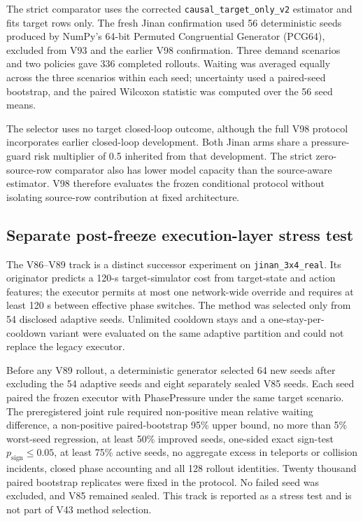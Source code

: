 The strict comparator uses the corrected
\texttt{causal\_target\_only\_v2} estimator and fits target rows only.  The fresh
Jinan confirmation used 56 deterministic seeds produced by NumPy's 64-bit
Permuted Congruential Generator (PCG64), excluded from V93 and the earlier V98
confirmation.  Three
demand scenarios and two policies gave 336
completed rollouts.  Waiting was averaged equally across the three scenarios
within each seed; uncertainty used a paired-seed bootstrap, and the paired
Wilcoxon statistic was computed over the 56 seed means.

The selector uses no target closed-loop outcome, although the full V98
protocol incorporates earlier closed-loop development.  Both Jinan arms share
a pressure-guard risk multiplier of 0.5 inherited from that development.
The strict zero-source-row comparator also has lower model capacity than the
source-aware estimator.  V98 therefore evaluates the frozen conditional
protocol without isolating source-row contribution at fixed architecture.

\subsection{Separate post-freeze execution-layer stress test}

The V86--V89 track is a distinct successor experiment on
\texttt{jinan\_3x4\_real}.  Its originator predicts a 120-s target-simulator cost
from target-state and action features; the executor permits at most one
network-wide override and requires at least 120 s between effective phase
switches.  The method was selected only from 54 disclosed adaptive seeds.
Unlimited cooldown stays and a one-stay-per-cooldown variant were evaluated on
the same adaptive partition and could not replace the legacy executor.

Before any V89 rollout, a deterministic generator selected 64 new seeds after
excluding the 54 adaptive seeds and eight separately sealed V85 seeds.  Each
seed paired the frozen executor with PhasePressure under the same target
scenario.  The preregistered joint rule required non-positive mean relative
waiting difference, a non-positive paired-bootstrap 95\% upper bound, no more
than 5\% worst-seed regression, at least 50\% improved seeds, one-sided exact
sign-test $p_{\mathrm{sign}}\leq0.05$, at least 75\% active seeds, no aggregate excess in
teleports or collision incidents, closed phase accounting and all 128 rollout
identities.  Twenty thousand paired bootstrap replicates were fixed in the
protocol.  No failed seed was excluded, and V85 remained sealed.  This track is
reported as a stress test and is not part of V43 method selection.

